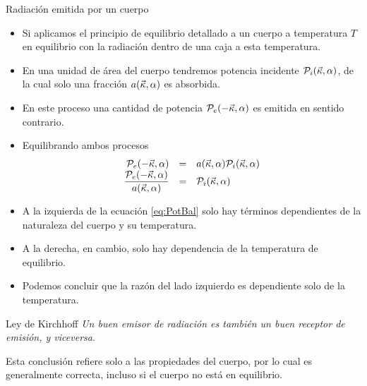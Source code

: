 \documentclass{sintefbeamer}
\begin{document}
\begin{frame}{Radiación emitida por un cuerpo}
    \begin{itemize}
        \item Si aplicamos el principio de equilibrio detallado a un cuerpo a temperatura $T$ en equilibrio con la radiación dentro de una caja a esta temperatura.\pause
        \item En una unidad de área del cuerpo tendremos potencia incidente $\mathcal{P}_i(\Vec{\kappa},\alpha)$, de la cual solo una fracción $a(\Vec{\kappa},\alpha)$ es absorbida.\pause
        \item En este proceso una cantidad de potencia $\mathcal{P}_e(-\Vec{\kappa},\alpha)$ es emitida en sentido contrario.
        \item Equilibrando ambos procesos\pause
        \begin{equation}
            \begin{array}{rcl}
                \mathcal{P}_e(-\Vec{\kappa},\alpha) &=& a(\Vec{\kappa},\alpha) \mathcal{P}_i(\Vec{\kappa},\alpha) \\
                \dfrac{\mathcal{P}_e(-\Vec{\kappa},\alpha)}{a(\Vec{\kappa},\alpha)} &=& \mathcal{P}_i(\Vec{\kappa},\alpha)
            \end{array}
            \label{eq:PotBal}
        \end{equation}
    \end{itemize}
\end{frame}

\begin{frame}
    \begin{itemize}
        \item A la izquierda de la ecuación \ref{eq:PotBal} solo hay términos dependientes de la naturaleza del cuerpo y su temperatura.
        \item A la derecha, en cambio, solo hay dependencia de la temperatura de equilibrio.\pause
        \item Podemos concluir que la razón del lado izquierdo es dependiente solo de la temperatura.\pause
    \end{itemize}
    \begin{block}{Ley de Kirchhoff}
        \emph{Un buen emisor de radiación es también un buen receptor de emisión, y viceversa}.
        
        Esta conclusión refiere solo a las propiedades del cuerpo, por lo cual es generalmente correcta, incluso si el cuerpo no está en equilibrio.
    \end{block}
\end{frame}
\end{document}
